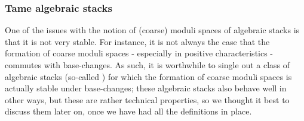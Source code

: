         \subsubsection{Tame algebraic stacks}
            One of the issues with the notion of (coarse) moduli spaces of algebraic stacks is that it is not very stable. For instance, it is not always the case that the formation of coarse moduli spaces - especially in positive characteristics - commutes with base-changes. As such, it is worthwhile to single out a class of algebraic stacks (so-called ) for which the formation of coarse moduli spaces is actually stable under base-changes; these algebraic stacks also behave well in other ways, but these are rather technical properties, so we thought it best to discuss them later on, once we have had all the definitions in place. 
